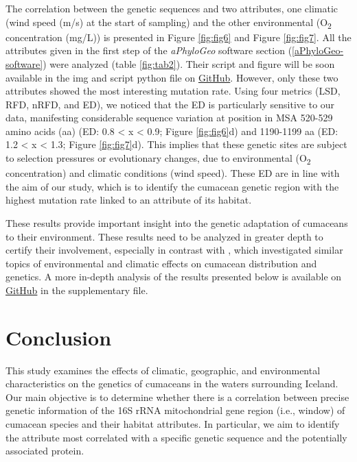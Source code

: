 The correlation between the genetic sequences and two attributes, one climatic (wind speed (m/s) at the start of sampling) and the other environmental (O\textsubscript{2} concentration (mg/L)) is presented in Figure \ref{fig:fig6} and Figure \ref{fig:fig7}. All the attributes given in the first step of the \textit{aPhyloGeo} software section (\autoref{aPhyloGeo-software}) were analyzed (table \ref{fig:tab2}). Their script and figure will be soon available in the img and script python file on \href{https://github.com/tahiri-lab/Cumacea_aPhyloGeo}{GitHub}. However, only these two attributes showed the most interesting mutation rate. Using four metrics (LSD, RFD, nRFD, and ED), we noticed that the ED is particularly sensitive to our data, manifesting considerable sequence variation at position in MSA 520-529 amino acids (aa) (ED: 0.8 < x < 0.9; Figure \ref{fig:fig6}d) and 1190-1199 aa (ED: 1.2 < x < 1.3; Figure \ref{fig:fig7}d). This implies that these genetic sites are subject to selection pressures or evolutionary changes, due to environmental (O\textsubscript{2} concentration) and climatic conditions (wind speed). These ED are in line with the aim of our study, which is to identify the cumacean genetic region with the highest mutation rate linked to an attribute of its habitat.

These results provide important insight into the genetic adaptation of cumaceans to their environment. These results need to be analyzed in greater depth to certify their involvement, especially in contrast with \citep{uhlir_adding_2021}, which investigated similar topics of environmental and climatic effects on cumacean distribution and genetics. A more in-depth analysis of the results presented below is available on \href{https://github.com/tahiri-lab/Cumacea_aPhyloGeo}{GitHub} in the supplementary file.

\section{Conclusion}\label{conclusion}
This study examines the effects of climatic, geographic, and environmental characteristics on the genetics of cumaceans in the waters surrounding Iceland. Our main objective is to determine whether there is a  correlation between precise genetic information of the 16S rRNA mitochondrial gene region (i.e., window) of cumacean species and their habitat attributes. In particular, we aim to identify the attribute most correlated with a specific genetic sequence and the potentially associated protein.

